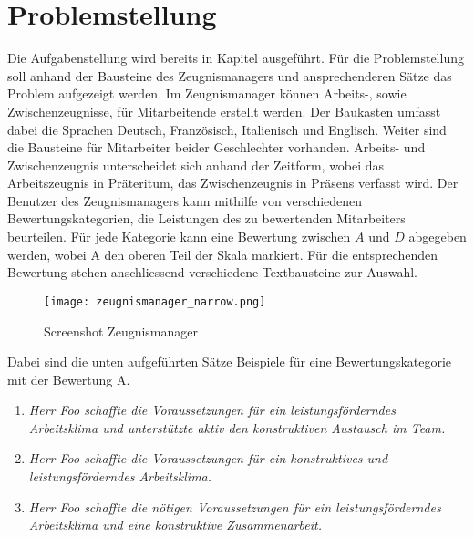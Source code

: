 \section{Problemstellung}
\label{sec:Problemstellung}
Die Aufgabenstellung wird bereits in Kapitel  ausgeführt. Für die
Problemstellung soll anhand der Bausteine des Zeugnismanagers und ansprechenderen Sätze das Problem aufgezeigt werden. 
\newline
\newline
Im Zeugnismanager können Arbeits-, sowie Zwischenzeugnisse, für Mitarbeitende erstellt werden. Der Baukasten umfasst
dabei die Sprachen Deutsch, Französisch, Italienisch und Englisch. Weiter sind die Bausteine für Mitarbeiter beider
Geschlechter vorhanden. Arbeits- und Zwischenzeugnis unterscheidet sich anhand der Zeitform, wobei das Arbeitszeugnis in
Präteritum, das Zwischenzeugnis in Präsens verfasst wird.
\newline
\newline
Der Benutzer des Zeugnismanagers kann mithilfe von verschiedenen Bewertungskategorien, die Leistungen des zu bewertenden
Mitarbeiters beurteilen. Für jede Kategorie kann eine Bewertung zwischen $A$ und $D$ abgegeben werden, wobei A den oberen
Teil der Skala markiert. Für die entsprechenden Bewertung stehen anschliessend verschiedene Textbausteine zur Auswahl.

\begin{figure}[H]
	\centering
	\texttt{[image: zeugnismanager\_narrow.png]}
	\caption{Screenshot Zeugnismanager}
	\label{fig:screenshot_zeugnismanager}
\end{figure}
\noindent
\newline
Dabei sind die unten aufgeführten Sätze Beispiele für eine Bewertungskategorie mit der Bewertung A.
\begin{enumerate}
	\setlength\itemsep{0em}
	\item \textit{Herr Foo schaffte die Voraussetzungen für ein leistungsförderndes Arbeitsklima und unterstützte aktiv den konstruktiven Austausch im Team.}
	\item \textit{Herr Foo schaffte die Voraussetzungen für ein konstruktives und leistungsförderndes Arbeitsklima.}
	\item \textit{Herr Foo schaffte die nötigen Voraussetzungen für ein leistungsförderndes Arbeitsklima und eine konstruktive Zusammenarbeit.}
\end{enumerate}


